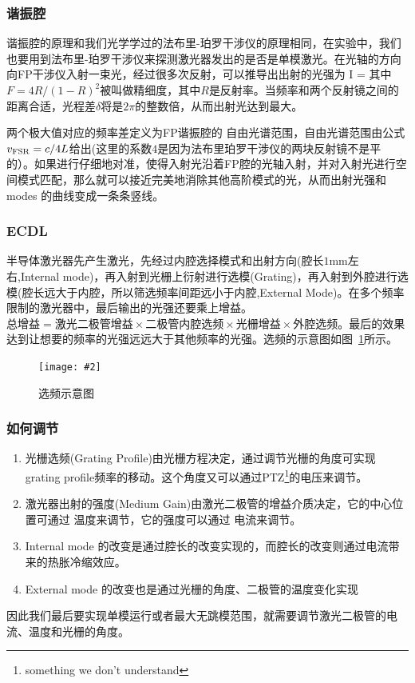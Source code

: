 \documentclass[10pt,a4paper]{ctexart}
\newcommand{\cpic}[2]{
\begin{center}
\texttt{[image: \#2]}
\end{center}
}
\newcommand{\cpicn}[3]
{
\begin{figure}[H]
\cpic{#1}{#2}
\caption{\color{red}#3\label{#2}}
\end{figure}
}
\begin{document}
\subsubsection{谐振腔}
谐振腔的原理和我们光学学过的法布里-珀罗干涉仪的原理相同，在实验中，我们也要用到法布里-珀罗干涉仪来探测激光器发出的是否是单模激光。在光轴的方向向FP干涉仪入射一束光，经过很多次反射，可以推导出出射的光强为
\beq
I = 
\eeq
其中$F = 4R/(1-R)^2$被叫做精细度，其中$R$是反射率。当频率和两个反射镜之间的距离合适，光程差$\delta$将是$2\pi$的整数倍，从而出射光达到最大。

两个极大值对应的频率差定义为FP谐振腔的{\color{red} 自由光谱范围}，自由光谱范围由公式$v_{\rm FSR}=c/4L$给出(这里的系数$4$是因为法布里珀罗干涉仪的两块反射镜不是平的）。如果进行仔细地对准，使得入射光沿着FP腔的光轴入射，并对入射光进行空间模式匹配，那么就可以接近完美地消除其他高阶模式的光，从而出射光强和 modes 的曲线变成一条条竖线。

\subsubsection{ECDL}
半导体激光器先产生激光，先经过内腔选择模式和出射方向(腔长$1$mm左右,Internal mode)，再入射到光栅上衍射进行选模(Grating)，再入射到外腔进行选模(腔长远大于内腔，所以筛选频率间距远小于内腔,External Mode)。在多个频率限制的激光器中，最后输出的光强还要乘上增益。$\text{总增益}=\text{激光二极管增益}\times \text{二极管内腔选频}\times \text{光栅增益}\times\text{外腔选频}$。最后的效果达到让想要的频率的光强远远大于其他频率的光强。选频的示意图如图~\ref{ECDL}所示。
\cpicn{0.3}{ECDL}{选频示意图}
\subsubsection{如何调节}
\begin{enumerate}
	\item 光栅选频(Grating Profile)由光栅方程决定，通过调节光栅的角度可实现grating profile频率的移动。这个角度又可以通过PTZ\footnote{something we don't understand}的电压来调节。
	\item 激光器出射的强度(Medium Gain)由激光二极管的增益介质决定，它的中心位置可通过{\color{red} 温度}来调节，它的强度可以通过{\color{red} 电流}来调节。
	\item Internal mode 的改变是通过腔长的改变实现的，而腔长的改变则通过电流带来的热胀冷缩效应。
	\item External mode 的改变也是通过光栅的角度、二极管的温度变化实现
\end{enumerate}
因此我们最后要实现单模运行或者最大无跳模范围，就需要调节激光二极管的电流、温度和光栅的角度。
\newpage
\end{document}

